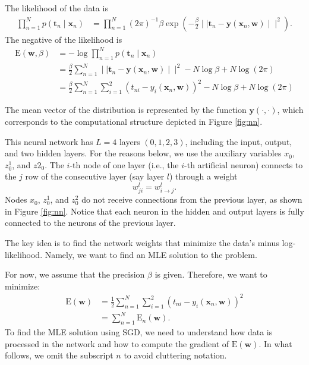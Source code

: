 \documentclass{tufte-handout}
\begin{document}
The  likelihood of the data is
\begin{align*}
\prod_{n=1}^N p(\mathbf t_n\mid \mathbf  x_n) &=  \prod_{n=1}^N  (2\pi)^{-1}  \beta \exp \left(-\frac{\beta}{2}  \mid\mid \mathbf t_n -  \mathbf y(\mathbf x_n, \mathbf w) \mid\mid^2 \right).
\end{align*}
The negative of the likelihood is 
\begin{align*}
\mathrm E(\mathbf w,\beta) &= -\log \prod_{n=1}^N p(\mathbf t_n\mid \mathbf  x_n)\\ &=  \frac{\beta}{2}  \sum_{n=1}^N   \mid\mid \mathbf t_n -  \mathbf y(\mathbf x_n, \mathbf w) \mid\mid^2  - N \log \beta  + N \log (2\pi)\\
&=  \frac{\beta}{2}  \sum_{n=1}^N \sum_{i=1}^2 \left( t_{ni} -  y_i(\mathbf x_n, \mathbf w) \right)^2 - N \log \beta  + N \log (2\pi)
\end{align*}

The mean vector of the distribution is represented by the function  $\mathbf y(\cdot,\cdot)$, which corresponds to the computational structure depicted in Figure \ref{fig:nn}.

This neural network has $L=4$ layers $(0,1,2,3)$, including the input, output, and two hidden layers. For the reasons below, we use the auxiliary variables $x_0$, $ z^1_0$, and $ z2_0$.
The  $i$-th node of one layer (i.e., the $i$-th artificial neuron) connects to the $j$ row of the consecutive layer  (say layer $l$) through a weight $$w^l_{ji} = w^l_{i\rightarrow j}.$$ Nodes $x_0$, $z^1_0$, and $z^2_0$ do not receive 
connections from the previous layer, as shown in Figure \ref{fig:nn}.  Notice that each neuron in the hidden and output layers is fully connected to the neurons of the previous layer.

The key idea is to find the network weights that minimize the data's minus log-likelihood. Namely, we want to find 
an  MLE solution to the problem. 

For now, we assume that the precision $\beta$ is given.  Therefore, we want to  minimize:
\begin{align*}
\mathrm E(\mathbf w) &=  \frac{1}{2}\sum_{n=1}^N \sum_{i=1}^2 \left( t_{ni} -  y_i(\mathbf x_n, \mathbf w) \right)^2 \\
&=  \sum_{n=1}^N \mathrm E_n(\mathbf w).
\end{align*}
To find the MLE solution using SGD, we need to understand 
how data is processed in the network and how to compute the gradient of $\mathrm E(\mathbf w)$. In what follows,
we omit the subscript $n$ to avoid cluttering notation.
\end{document}
